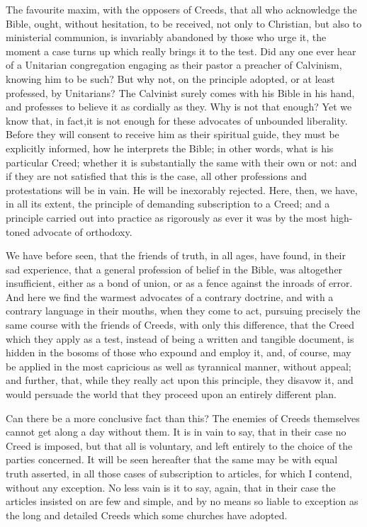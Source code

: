 \documentclass[
]{book}
\begin{document}
The favourite maxim, with the opposers of Creeds, that all who acknowledge the Bible, ought, without hesitation, to be received, not only to Christian, but also to ministerial communion, is invariably abandoned by those who urge it, the moment a case turns up which really brings it to the test. Did any one ever hear of a Unitarian congregation engaging as their pastor a preacher of Calvinism, knowing him to be such? But why not, on the principle adopted, or at least professed, by Unitarians? The Calvinist surely comes with his Bible in his hand, and professes to believe it as cordially as they. Why is not that enough? Yet we know that, in fact,it is not enough for these advocates of unbounded liberality. Before they will consent to receive him as their spiritual guide, they must be explicitly informed, how he interprets the Bible; in other words, what is his particular Creed; whether it is substantially the same with their own or not: and if they are not satisfied that this is the case, all other professions and protestations will be in vain. He will be inexorably rejected. Here, then, we have, in all its extent, the principle of demanding subscription to a Creed; and a principle carried out into practice as rigorously as ever it was by the most high-toned advocate of orthodoxy.

We have before seen, that the friends of truth, in all ages, have found, in their sad experience, that a general profession of belief in the Bible, was altogether insufficient, either as a bond of union, or as a fence against the inroads of error. And here we find the warmest advocates of a contrary doctrine, and with a contrary language in their mouths, when they come to act, pursuing precisely the same course with the friends of Creeds, with only this difference, that the Creed which they apply as a test, instead of being a written and tangible document, is hidden in the bosoms of those who expound and employ it, and, of course, may be applied in the most capricious as well as tyrannical manner, without appeal; and further, that, while they really act upon this principle, they disavow it, and would persuade the world that they proceed upon an entirely different plan.

Can there be a more conclusive fact than this? The enemies of Creeds themselves cannot get along a day without them. It is in vain to say, that in their case no Creed is imposed, but that all is voluntary, and left entirely to the choice of the parties concerned. It will be seen hereafter that the same may be with equal truth asserted, in all those cases of subscription to articles, for which I contend, without any exception. No less vain is it to say, again, that in their case the articles insisted on are few and simple, and by no means so liable to exception as the long and detailed Creeds which some churches have adopted.
\end{document}
